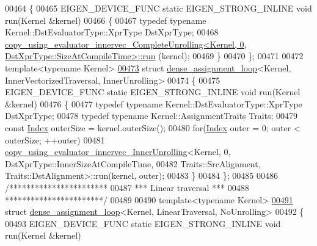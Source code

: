 \begin{DoxyCode}
00464 \{
00465   EIGEN\_DEVICE\_FUNC \textcolor{keyword}{static} EIGEN\_STRONG\_INLINE \textcolor{keywordtype}{void} run(Kernel &kernel)
00466   \{
00467     \textcolor{keyword}{typedef} \textcolor{keyword}{typename} Kernel::DstEvaluatorType::XprType DstXprType;
00468     
      \hyperlink{struct_eigen_1_1internal_1_1copy__using__evaluator__innervec___complete_unrolling}{copy\_using\_evaluator\_innervec\_CompleteUnrolling<Kernel, 0, DstXprType::SizeAtCompileTime>::run}
      (kernel);
00469   \}
00470 \};
00471 
00472 \textcolor{keyword}{template}<\textcolor{keyword}{typename} Kernel>
\hyperlink{struct_eigen_1_1internal_1_1dense__assignment__loop_3_01_kernel_00_01_inner_vectorized_traversal_00_01_inner_unrolling_01_4}{00473} \textcolor{keyword}{struct }\hyperlink{struct_eigen_1_1internal_1_1dense__assignment__loop}{dense\_assignment\_loop}<Kernel, InnerVectorizedTraversal, InnerUnrolling>
00474 \{
00475   EIGEN\_DEVICE\_FUNC \textcolor{keyword}{static} EIGEN\_STRONG\_INLINE \textcolor{keywordtype}{void} run(Kernel &kernel)
00476   \{
00477     \textcolor{keyword}{typedef} \textcolor{keyword}{typename} Kernel::DstEvaluatorType::XprType DstXprType;
00478     \textcolor{keyword}{typedef} \textcolor{keyword}{typename} Kernel::AssignmentTraits Traits;
00479     \textcolor{keyword}{const} \hyperlink{namespace_eigen_a62e77e0933482dafde8fe197d9a2cfde}{Index} outerSize = kernel.outerSize();
00480     \textcolor{keywordflow}{for}(\hyperlink{namespace_eigen_a62e77e0933482dafde8fe197d9a2cfde}{Index} outer = 0; outer < outerSize; ++outer)
00481       \hyperlink{struct_eigen_1_1internal_1_1copy__using__evaluator__innervec___inner_unrolling}{copy\_using\_evaluator\_innervec\_InnerUnrolling}<Kernel, 0, 
      DstXprType::InnerSizeAtCompileTime,
00482                                                    Traits::SrcAlignment, Traits::DstAlignment>::run(kernel,
       outer);
00483   \}
00484 \};
00485 
00486 \textcolor{comment}{/***********************}
00487 \textcolor{comment}{*** Linear traversal ***}
00488 \textcolor{comment}{***********************/}
00489 
00490 \textcolor{keyword}{template}<\textcolor{keyword}{typename} Kernel>
\hyperlink{struct_eigen_1_1internal_1_1dense__assignment__loop_3_01_kernel_00_01_linear_traversal_00_01_no_unrolling_01_4}{00491} \textcolor{keyword}{struct }\hyperlink{struct_eigen_1_1internal_1_1dense__assignment__loop}{dense\_assignment\_loop}<Kernel, LinearTraversal, NoUnrolling>
00492 \{
00493   EIGEN\_DEVICE\_FUNC \textcolor{keyword}{static} EIGEN\_STRONG\_INLINE \textcolor{keywordtype}{void} run(Kernel &kernel)

\end{DoxyCode}
